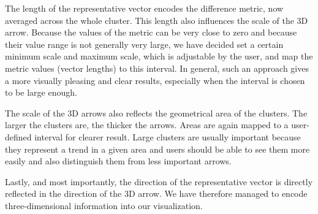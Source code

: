 The length of the representative vector encodes the difference metric, now averaged across the whole cluster. This length also influences the scale of the 3D arrow. Because the values of the metric can be very close to zero and because their value range is not generally very large, we have decided set a certain minimum scale and maximum scale, which is adjustable by the user, and map the metric values (vector lengths) to this interval. In general, such an approach gives a more visually pleasing and clear results, especially when the interval is chosen to be large enough.

The scale of the 3D arrows also reflects the geometrical area of the clusters. The larger the clusters are, the thicker the arrows. Areas are again mapped to a user-defined interval for clearer result. Large clusters are usually important because they represent a trend in a given area and users should be able to see them more easily and also distinguish them from less important arrows.

Lastly, and most importantly, the direction of the representative vector is directly reflected in the direction of the 3D arrow. We have therefore managed to encode three-dimensional information into our visualization.

